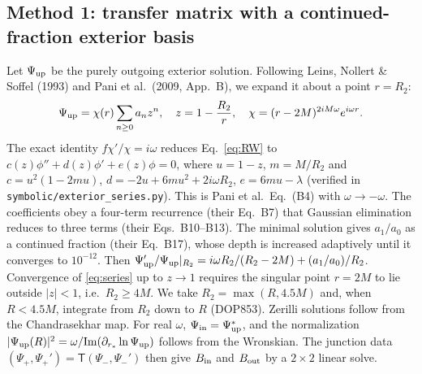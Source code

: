 \documentclass[11pt,a4paper]{article}
\numberwithin{equation}{section}
\begin{document}
\subsection{Method 1: transfer matrix with a continued-fraction exterior basis}
Let $\Psi_{\rm up}$ be the purely outgoing exterior solution. Following Leins, Nollert \& Soffel (1993)
and Pani et al.\ (2009, App.~B), we expand it about a point $r=R_2$:
\begin{equation}
\Psi_{\rm up}=\chi(r)\sum_{n\ge0}a_nz^n,\quad z=1-\frac{R_2}{r},\quad \chi=(r-2M)^{2iM\omega}e^{i\omega r}.
\label{eq:series}
\end{equation}
The exact identity $f\chi'/\chi=i\omega$ reduces Eq.~\eqref{eq:RW} to $c(z)\phi''+d(z)\phi'+e(z)\phi=0$, where
$u=1-z$, $m=M/R_2$ and
$c=u^2(1-2mu)$, $d=-2u+6mu^2+2i\omega R_2$, $e=6mu-\lambda$ (verified in
\texttt{symbolic/exterior\_series.py}). This is Pani et al.\ Eq.~(B4) with $\omega\to-\omega$. The
coefficients obey a four-term recurrence (their Eq.~B7) that Gaussian elimination reduces to three terms
(their Eqs.~B10--B13). The minimal solution gives $a_1/a_0$ as a continued fraction (their Eq.~B17), whose
depth is increased adaptively until it converges to $10^{-12}$. Then
$\Psi_{\rm up}'/\Psi_{\rm up}|_{R_2}=i\omega R_2/(R_2-2M)+(a_1/a_0)/R_2$. Convergence of \eqref{eq:series} up to
$z\to1$ requires the singular point $r=2M$ to lie outside $|z|<1$, i.e.\ $R_2\ge4M$. We take
$R_2=\max(R,4.5M)$ and, when $R<4.5M$, integrate from $R_2$ down to $R$ (DOP853). Zerilli solutions follow
from the Chandrasekhar map. For real $\omega$, $\Psi_{\rm in}=\Psi_{\rm up}^*$, and the normalization
$|\Psi_{\rm up}(R)|^2=\omega/{\rm Im}(\partial_{r_*}\ln\Psi_{\rm up})$ follows from the Wronskian. The
junction data $(\Psi_+,\Psi_+')=\mathsf T(\Psi_-,\Psi_-')$ then give $B_{\rm in}$ and $B_{\rm out}$ by a $2\times2$
linear solve.
\end{document}
